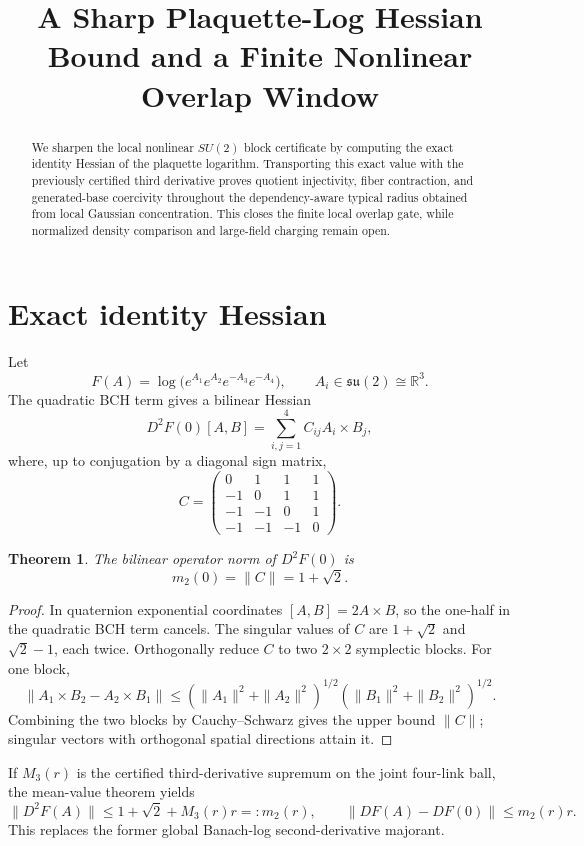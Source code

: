 \documentclass[11pt]{article}
\title{A Sharp Plaquette-Log Hessian Bound and a Finite Nonlinear Overlap Window}
\author{}
\date{}
\newtheorem{theorem}{Theorem}
\begin{document}
\maketitle

\begin{abstract}
We sharpen the local nonlinear $SU(2)$ block certificate by computing the
exact identity Hessian of the plaquette logarithm.  Transporting this exact
value with the previously certified third derivative proves quotient
injectivity, fiber contraction, and generated-base coercivity throughout the
dependency-aware typical radius obtained from local Gaussian concentration.
This closes the finite local overlap gate, while normalized density comparison
and large-field charging remain open.
\end{abstract}

\section{Exact identity Hessian}
Let
\[
 F(A)=\log\bigl(e^{A_1}e^{A_2}e^{-A_3}e^{-A_4}\bigr),
 \qquad A_i\in\mathfrak{su}(2)\cong\mathbb R^3.
\]
The quadratic BCH term gives a bilinear Hessian
\[
 D^2F(0)[A,B]=\sum_{i,j=1}^4 C_{ij}A_i\times B_j,
\]
where, up to conjugation by a diagonal sign matrix,
\[
 C=\begin{pmatrix}
 0&1&1&1\\-1&0&1&1\\-1&-1&0&1\\-1&-1&-1&0
 \end{pmatrix}.
\]

\begin{theorem}
The bilinear operator norm of $D^2F(0)$ is
\[
 m_2(0)=\|C\|=1+\sqrt2.
\]
\end{theorem}
\begin{proof}
In quaternion exponential coordinates $[A,B]=2A\times B$, so the one-half
in the quadratic BCH term cancels.  The singular values of $C$ are
$1+\sqrt2$ and $\sqrt2-1$, each twice.  Orthogonally reduce $C$ to two $2\times2$
symplectic blocks.  For one block,
\[
 \|A_1\times B_2-A_2\times B_1\|
 \le (\|A_1\|^2+\|A_2\|^2)^{1/2}
      (\|B_1\|^2+\|B_2\|^2)^{1/2}.
\]
Combining the two blocks by Cauchy--Schwarz gives the upper bound $\|C\|$;
singular vectors with orthogonal spatial directions attain it.
\end{proof}

If $M_3(r)$ is the certified third-derivative supremum on the joint
four-link ball, the mean-value theorem yields
\[
 \|D^2F(A)\|\le 1+\sqrt2+M_3(r)r=:m_2(r),
 \qquad
 \|DF(A)-DF(0)\|\le m_2(r)r.
\]
This replaces the former global Banach-log second-derivative majorant.
\end{document}
